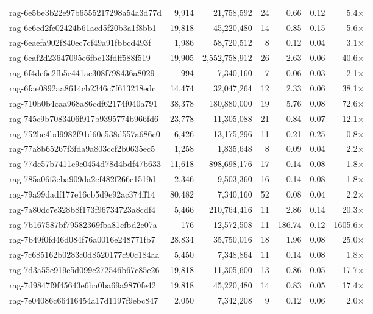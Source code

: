 \begin{table}[h!]
\begin{tabular}{lrrrrrr}
rag-6e5be3b22e97b6555217298a54a3d77d & 9,914 & 21,758,592 & 24 & 0.66 & 0.12 & 5.4$\times$ \\
rag-6e6ed2fc02424b61acd5f20b3a1f8bb1 & 19,818 & 45,220,480 & 14 & 0.85 & 0.15 & 5.6$\times$ \\
rag-6eaefa902f840ec7cf49a91fbbcd493f & 1,986 & 58,720,512 & 8 & 0.12 & 0.04 & 3.1$\times$ \\
rag-6eaf2d23647095e6fbc13fdff588f519 & 19,905 & 2,552,758,912 & 26 & 2.63 & 0.06 & 40.6$\times$ \\
rag-6f4dc6e2fb5e441ac308f798436a8029 & 994 & 7,340,160 & 7 & 0.06 & 0.03 & 2.1$\times$ \\
rag-6fae0892aa8614cb2346c7f613218edc & 14,474 & 32,047,264 & 12 & 2.33 & 0.06 & 38.1$\times$ \\
rag-710b0b4caa968a86cdf62174f040a791 & 38,378 & 180,880,000 & 19 & 5.76 & 0.08 & 72.6$\times$ \\
rag-745c9b7083406f917b9395774b966fd6 & 23,778 & 11,305,088 & 21 & 0.84 & 0.07 & 12.1$\times$ \\
rag-752bc4bd9982f91d60e538d557a686c0 & 6,426 & 13,175,296 & 11 & 0.21 & 0.25 & 0.8$\times$ \\
rag-77a8b65267f3fda9a803ccf2b0635ec5 & 1,258 & 1,835,648 & 8 & 0.09 & 0.04 & 2.2$\times$ \\
rag-77dc57b7411c9c0454d78d4bdf47b633 & 11,618 & 898,698,176 & 17 & 0.14 & 0.08 & 1.8$\times$ \\
rag-785a06f3eba909da2cf482f266c1519d & 2,346 & 9,503,360 & 16 & 0.14 & 0.08 & 1.8$\times$ \\
rag-79a99dadf177e16cb5d9e92ac374ff14 & 80,482 & 7,340,160 & 52 & 0.08 & 0.04 & 2.2$\times$ \\
rag-7a80dc7e328b8f173f96734723a8cdf4 & 5,466 & 210,764,416 & 11 & 2.86 & 0.14 & 20.3$\times$ \\
rag-7b167587bf79582369fba81cfbd2e07a & 176 & 12,572,508 & 11 & 186.74 & 0.12 & 1605.6$\times$ \\
rag-7b49f0fd46d084f76a0016e248771fb7 & 28,834 & 35,750,016 & 18 & 1.96 & 0.08 & 25.0$\times$ \\
rag-7c685162b0283c0d8520177c90c184aa & 5,450 & 7,348,864 & 11 & 0.14 & 0.08 & 1.8$\times$ \\
rag-7d3a55e919e5d099c272546b67c85e26 & 19,818 & 11,305,600 & 13 & 0.86 & 0.05 & 17.7$\times$ \\
rag-7d9847f9f45643e6ba0ba69a9870fe42 & 19,818 & 45,220,480 & 14 & 0.83 & 0.05 & 17.4$\times$ \\
rag-7e04086c66416454a17d1197f9ebc847 & 2,050 & 7,342,208 & 9 & 0.12 & 0.06 & 2.0$\times$ \\

\end{tabular}
\end{table}
